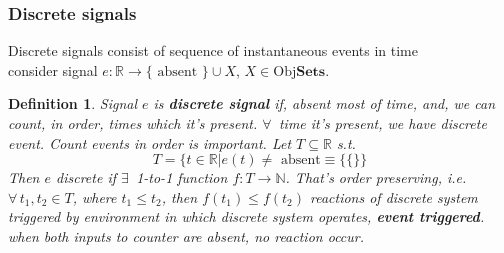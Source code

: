 \documentclass[10pt]{amsart}
\newtheorem{definition}{Definition}
\begin{document}
\begin{multicols*}{2}
\subsubsection{Discrete signals}
Discrete signals consist of sequence of instantaneous events in time \\
consider signal $e: \mathbb{R} \to \lbrace \text{ absent } \rbrace \cup X$, $X \in \text{Obj}\textbf{Sets}$.  
\begin{definition}
	Signal $e$ is \textbf{discrete signal} if, absent most of time, and, we can count, in order, times which it's present.  $\forall \, $ time it's present, we have discrete event.   
	Count events in order is important.  
	Let $T \subseteq \mathbb{R}$ s.t. 
	\[
	T = \lbrace t\in \mathbb{R} | e(t) \neq \text{ absent} \equiv \lbrace \lbrace \rbrace \rbrace 
	\]
	Then $e$ discrete if $\exists \, $ 1-to-1 function $f: T \to \mathbb{N}$.  That's order preserving, i.e. $\forall \, t_1,t_2 \in T$, where $t_1 \leq t_2$, then $f(t_1) \leq f(t_2)$  
	reactions of discrete system triggered by environment in which discrete system operates, \textbf{ event triggered}.  \\
	when both inputs to counter are absent, no reaction occur.  
\end{definition}

\end{multicols*}
\end{document}
